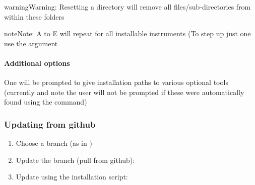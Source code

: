 \documentclass[a4paper,10pt,english]{report}
\begin{document}
\begin{sphinxadmonition}{warning}{Warning:}
Resetting a directory will remove all files/sub-directories from within these folders
\end{sphinxadmonition}

\begin{sphinxadmonition}{note}{Note:}
A to E will repeat for all installable instruments (To step up just one use the  argument
\end{sphinxadmonition}


\paragraph{Additional options}
\label{\detokenize{user/general/installation:additional-options}}
One will be prompted to give installation paths to various optional tools (currently {\hyperref[\detokenize{misc/glossary:term-ds9}]{}}
and {\hyperref[\detokenize{misc/glossary:term-pdflatex}]{}}
note the user will not be prompted if these were automatically found using the 
command)


\subsubsection{Updating from github}
\label{\detokenize{user/general/installation:updating-from-github}}\label{\detokenize{user/general/installation:installation-update}}\begin{enumerate}
%
\item {} 
Choose a branch (as in {\hyperref[\detokenize{user/general/installation:installation-choose-branch}]{}})

\item {} 
Update the branch (pull from github):

\begin{sphinxVerbatim}[commandchars=\\\{\}]
    
\end{sphinxVerbatim}

\item {} 
Update using the installation script:

\begin{sphinxVerbatim}[commandchars=\\\{\}]
   
\end{sphinxVerbatim}

\end{enumerate}
\end{document}
